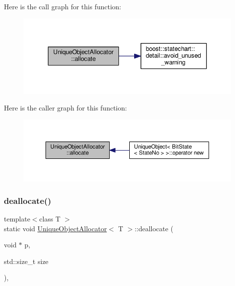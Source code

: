 Here is the call graph for this function\+:
\nopagebreak
\begin{figure}[H]
\begin{center}
\leavevmode
\includegraphics[width=336pt]{class_unique_object_allocator_a7baf5a708dcd516ce694499687e0cdc2_cgraph}
\end{center}
\end{figure}
Here is the caller graph for this function\+:
\nopagebreak
\begin{figure}[H]
\begin{center}
\leavevmode
\includegraphics[width=350pt]{class_unique_object_allocator_a7baf5a708dcd516ce694499687e0cdc2_icgraph}
\end{center}
\end{figure}
\mbox{\label{class_unique_object_allocator_a56c2cd1285c50ab8ed537aba9493b970}} 
\subsubsection{\texorpdfstring{deallocate()}{deallocate()}}
{\footnotesize\ttfamily template$<$class T $>$ \\
static void \mbox{\hyperlink{class_unique_object_allocator}{Unique\+Object\+Allocator}}$<$ T $>$\+::deallocate (\begin{DoxyParamCaption}\item[{void $\ast$}]{p,  }\item[{std\+::size\+\_\+t}]{size }\end{DoxyParamCaption})\hspace{0.3cm}{\ttfamily [inline]}, {\ttfamily [static]}}

